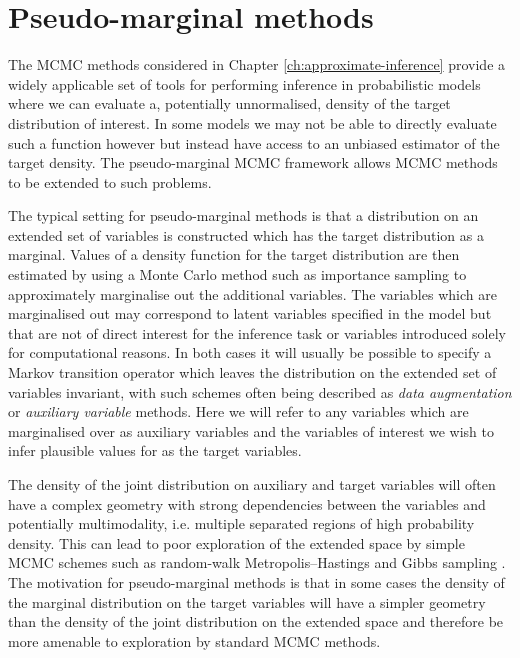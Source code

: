 \chapter{Pseudo-marginal methods}\label{ch:pseudo-marginal-methods}

The \ac{MCMC} methods considered in Chapter \ref{ch:approximate-inference} provide a widely applicable set of tools for performing inference in probabilistic models where we can evaluate a, potentially unnormalised, density of the target distribution of interest. In some models we may not be able to directly evaluate such a function however but instead have access to an unbiased estimator of the target density. The pseudo-marginal \ac{MCMC} framework \citep{andrieu2009pseudo} allows \ac{MCMC} methods to be extended to such problems.

The typical setting for pseudo-marginal methods is that a distribution on an extended set of variables is constructed which has the target distribution as a marginal. Values of a density function for the target distribution are then estimated by using a Monte Carlo method such as importance sampling to approximately marginalise out the additional variables. The variables which are marginalised out may correspond to latent variables specified in the model but that are not of direct interest for the inference task or variables introduced solely for computational reasons. In both cases it will usually be possible to specify a Markov transition operator which leaves the distribution on the extended set of variables invariant, with such schemes often being described as \emph{data augmentation} \citep{tanner1987calculation,van2001art} or \emph{auxiliary variable}  \citep{edwards1988generalization,higdon1998auxiliary} methods. Here we will refer to any variables which are marginalised over as auxiliary variables and the variables of interest we wish to infer plausible values for as the target variables.

The density of the joint distribution on auxiliary and target variables will often have a complex geometry with strong dependencies between the variables and potentially multimodality, i.e. multiple separated regions of high probability density. This can lead to poor exploration of the extended space by simple \ac{MCMC} schemes such as random-walk Metropolis--Hastings and Gibbs sampling \citep{andrieu2009pseudo}. The motivation for pseudo-marginal methods is that in some cases the density of the marginal distribution on the target variables will have a simpler geometry than the density of the joint distribution on the extended space and therefore be more amenable to exploration by standard \ac{MCMC} methods. 

